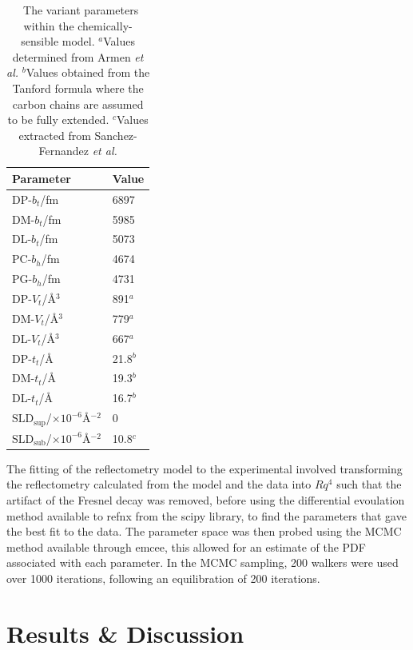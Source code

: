 \documentclass[twoside,twocolumn,9pt]{article}
\begin{document}
\begin{table}[h]
	\small
	\caption{\ The variant parameters within the chemically-sensible model. $^a$Values determined from Armen \emph{et al.}\cite{Armen1998} $^b$Values obtained from the Tanford formula where the carbon chains are assumed to be fully extended.\cite{Tanford1980} $^c$Values extracted from Sanchez-Fernandez \emph{et al.}\cite{Sanchez-Fernandez2016}}
	\label{tab:invariant}
	\begin{tabular*}{0.48\textwidth}{@{\extracolsep{\fill}}ll}
		\hline
		Parameter & Value \\
		\hline
		DP-$b_t$/fm & 6897 \\
		DM-$b_t$/fm & 5985 \\
		DL-$b_t$/fm & 5073 \\
		PC-$b_h$/fm & 4674 \\
		PG-$b_h$/fm & 4731 \\
		DP-$V_t$/\AA$^3$ & 891$^a$ \\
		DM-$V_t$/\AA$^3$ & 779$^a$ \\
		DL-$V_t$/\AA$^3$ & 667$^a$ \\	
		DP-$t_t$/\AA & 21.8$^b$ \\
		DM-$t_t$/\AA & 19.3$^b$ \\
		DL-$t_t$/\AA & 16.7$^b$ \\
		$\text{SLD}_{\text{sup}}$/$\times10^{-6}$\AA$^{-2}$ & 0\\
		$\text{SLD}_{\text{sub}}$/$\times10^{-6}$\AA$^{-2}$ & 10.8$^c$ \\
		\hline
	\end{tabular*}
\end{table}

The fitting of the reflectometry model to the experimental involved transforming the reflectometry calculated from the model and the data into $Rq^4$ such that the artifact of the Fresnel decay was removed, before using the differential evoulation method available to refnx from the scipy library,\cite{Jones2001} to find the parameters that gave the best fit to the data. The parameter space was then probed using the MCMC method available through emcee, this allowed for an estimate of the PDF associated with each parameter. In the MCMC sampling, 200 walkers were used over 1000 iterations, following an equilibration of 200 iterations.

\section{Results \& Discussion}
\end{document}
